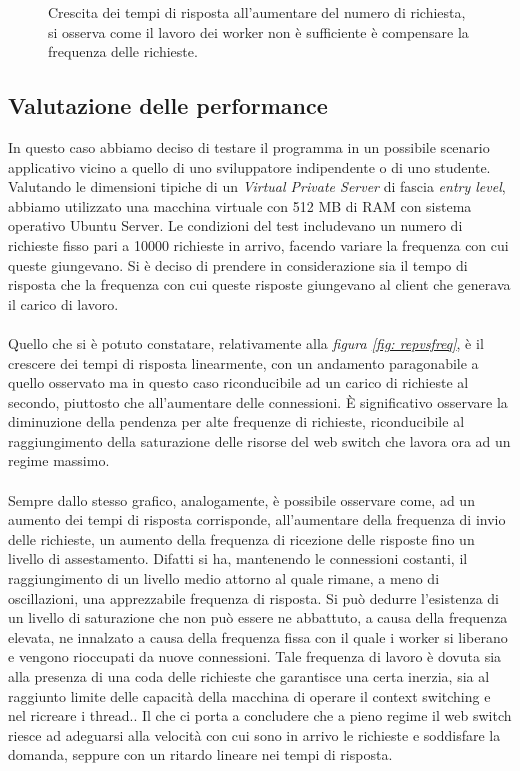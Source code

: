 \documentclass[italian]{tktltiki2}
\begin{document}
\begin{figure}[H]
\caption{Crescita dei tempi di risposta all'aumentare del numero di richiesta, si osserva come il lavoro dei worker non è sufficiente è compensare la frequenza delle richieste. \label{fig: cfr_reply_time2}}
\end{figure}
\subsection{Valutazione delle performance}
In questo caso abbiamo deciso di testare il programma in un possibile scenario applicativo vicino a quello di uno sviluppatore indipendente o di uno studente. Valutando le dimensioni tipiche di un \emph{Virtual Private Server} di fascia \emph{entry level}, abbiamo utilizzato una macchina virtuale con 512 MB di RAM con sistema operativo Ubuntu Server. Le condizioni del test includevano un numero di richieste fisso pari a 10000 richieste in arrivo, facendo variare la frequenza con cui queste giungevano. Si è deciso di prendere in considerazione sia il tempo di risposta che la frequenza con cui queste risposte giungevano al client che generava il carico di lavoro. 
\\
\\ 
Quello che si è potuto constatare, relativamente alla \emph{figura \ref{fig: repvsfreq}}, è il crescere dei tempi di risposta linearmente, con un andamento paragonabile a quello osservato ma in questo caso riconducibile ad un carico di richieste al secondo, piuttosto che all'aumentare delle connessioni. È significativo osservare la diminuzione della pendenza per alte frequenze di richieste, riconducibile al raggiungimento della saturazione delle risorse del web switch che lavora ora ad un regime massimo.
\\
\\
Sempre dallo stesso grafico, analogamente, è possibile osservare come, ad un aumento dei tempi di risposta corrisponde, all'aumentare della frequenza di invio delle richieste, un aumento della frequenza di ricezione delle risposte fino un livello di assestamento. Difatti si ha, mantenendo le connessioni costanti, il raggiungimento di un livello medio attorno al quale rimane, a meno di oscillazioni, una apprezzabile frequenza di risposta. Si può dedurre l'esistenza di un livello di saturazione che non può essere ne abbattuto, a causa della frequenza elevata, ne innalzato a causa della frequenza fissa con il quale i worker si liberano e vengono rioccupati da nuove connessioni. Tale frequenza di lavoro è dovuta sia alla presenza di una coda delle richieste che garantisce una certa inerzia, sia al raggiunto limite delle capacità della macchina di operare il context switching e nel ricreare i thread.. Il che ci porta a concludere che a pieno regime il web switch riesce ad adeguarsi alla velocità con cui sono in arrivo le richieste e soddisfare la domanda, seppure con un ritardo lineare nei tempi di risposta.
\end{document}
